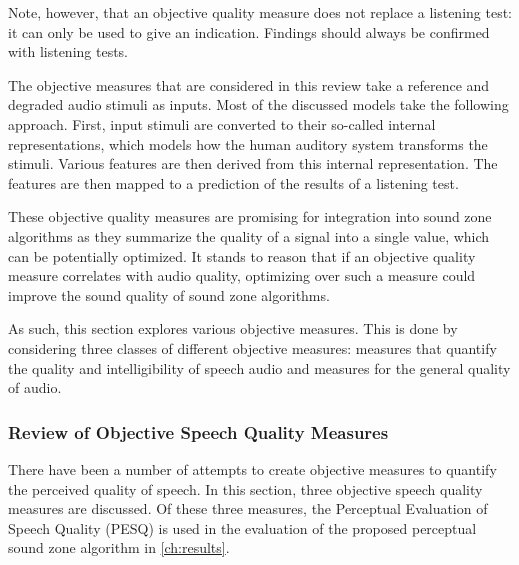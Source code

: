 Note, however, that an objective quality measure does not replace a listening test: it can only be used to give an 
indication.
Findings should always be confirmed with listening tests.

The objective measures that are considered in this review take a reference and degraded audio stimuli as inputs.
Most of the discussed models take the following approach.
First, input stimuli are converted to their so-called internal representations, which models how the 
human auditory system transforms the stimuli.
Various features are then derived from this internal representation.
The features are then mapped to a prediction of the results of a listening test.

These objective quality measures are promising for integration into sound zone algorithms as they summarize the 
quality of a signal into a single value, which can be potentially optimized. 
It stands to reason that if an objective quality measure correlates with audio quality, optimizing over such a measure
could improve the sound quality of sound zone algorithms.

As such, this section explores various objective measures.
This is done by considering three classes of different objective measures: measures that quantify the quality and intelligibility of speech audio and measures for the general quality of audio. 

\subsubsection{Review of Objective Speech Quality Measures}
There have been a number of attempts to create objective measures to quantify the perceived quality of speech.
In this section, three objective speech quality measures are discussed.
Of these three measures, the Perceptual Evaluation of Speech Quality (PESQ) is used in the evaluation of the proposed perceptual sound zone algorithm in \autoref{ch:results}.

